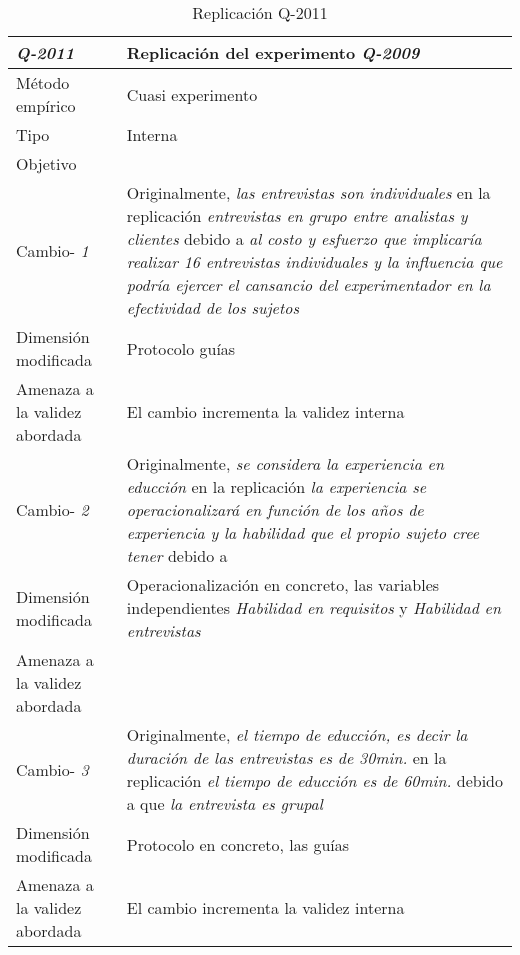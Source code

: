 
\begin{table}
\caption{Replicación Q-2011}
\begin{tabular}{| p{3.3cm} | p{9cm} |}
\hline

\textbf {\textit{Q-2011}} & Replicación del experimento \textit{Q-2009 }    \\  \hline

Método empírico &  Cuasi experimento   \\  \hline
Tipo &  Interna   \\  \hline
Objetivo  &      \\  \hline \hline

Cambio- \textit{1}   & \parbox[t]{9cm} {Originalmente,  \textit{las entrevistas son individuales} } \parbox[t]{9cm}{en la replicación \textit{ entrevistas en grupo entre analistas y clientes} }  debido a  \textit{al costo y esfuerzo que implicaría realizar 16 entrevistas individuales y la influencia que podría ejercer el cansancio del experimentador en la efectividad de los sujetos } \\  \hline
Dimensión modificada & 
 Protocolo guías    \\  \hline 
Amenaza a la validez abordada  & El cambio incrementa la validez  interna   \\  \hline
 \hline
Cambio- \textit{2}   & \parbox[t]{9cm} {Originalmente,  \textit{se considera la experiencia en educción} } \parbox[t]{9cm}{en la replicación \textit{la experiencia se operacionalizará en función de los años de experiencia y la habilidad que el propio sujeto cree tener} }  debido a   \textit{ } \\  \hline
Dimensión modificada & 
Operacionalización  en concreto, las variables independientes \textit { Habilidad en requisitos } y\textit { Habilidad en entrevistas }  \\  \hline 
Amenaza a la validez abordada  &    \\  \hline \hline

Cambio- \textit{3}   & \parbox[t]{9cm} {Originalmente,  \textit{el tiempo de educción, es decir la duración de las entrevistas es de 30min.} } \parbox[t]{9cm}{en la replicación \textit{el tiempo de educción es de 60min.} } debido a que \textit{la entrevista es grupal } \\  \hline
Dimensión modificada & 
 Protocolo en concreto, las guías     \\  \hline 
Amenaza a la validez abordada  & El cambio incrementa la validez  interna  \\  \hline \hline


\end{tabular}
\end{table}
